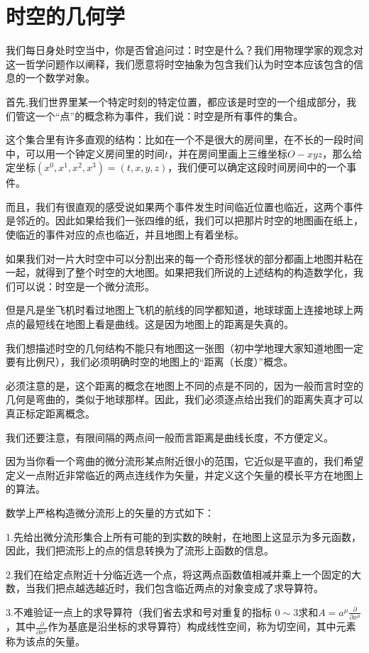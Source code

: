 \documentclass{article}
\begin{document}
\section{时空的几何学}
我们每日身处时空当中，你是否曾追问过：时空是什么？我们用物理学家的观念对这一哲学问题作以阐释，我们愿意将时空抽象为包含我们认为时空本应该包含的信息的一个数学对象。

首先,我们世界里某一个特定时刻的特定位置，都应该是时空的一个组成部分，我们管这一个“点”的概念称为事件，我们说：时空是所有事件的集合。

这个集合里有许多直观的结构：比如在一个不是很大的房间里，在不长的一段时间中，可以用一个钟定义房间里的时间$t$，并在房间里画上三维坐标$O-xyz$，那么给定坐标$(x^0,x^1,x^2,x^3)=(t,x,y,z)$，我们便可以确定这段时间房间中的一个事件。

而且，我们有很直观的感受说如果两个事件发生时间临近位置也临近，这两个事件是邻近的。因此如果给我们一张四维的纸，我们可以把那片时空的地图画在纸上，使临近的事件对应的点也临近，并且地图上有着坐标。

如果我们对一片大时空中可以分割出来的每一个奇形怪状的部分都画上地图并粘在一起，就得到了整个时空的大地图。如果把我们所说的上述结构的构造数学化，我们可以说：时空是一个微分流形。

但是凡是坐飞机时看过地图上飞机的航线的同学都知道，地球球面上连接地球上两点的最短线在地图上看是曲线。这是因为地图上的距离是失真的。

我们想描述时空的几何结构不能只有地图这一张图（初中学地理大家知道地图一定要有比例尺），我们必须明确时空的地图上的“距离（长度）”概念。

必须注意的是，这个距离的概念在地图上不同的点是不同的，因为一般而言时空的几何是弯曲的，类似于地球那样。因此，我们必须逐点给出我们的距离失真才可以真正标定距离概念。

我们还要注意，有限间隔的两点间一般而言距离是曲线长度，不方便定义。

因为当你看一个弯曲的微分流形某点附近很小的范围，它近似是平直的，我们希望定义一点附近非常临近的两点连线作为矢量，并定义这个矢量的模长平方在地图上的算法。

数学上严格构造微分流形上的矢量的方式如下：

1.先给出微分流形集合上所有可能的到实数的映射，在地图上这显示为多元函数，因此，我们把流形上的点的信息转换为了流形上函数的信息。

2.我们在给定点附近十分临近选一个点，将这两点函数值相减并乘上一个固定的大数，当我们把点越选越近时，我们包含临近两点的对象变成了求导算符。

3.不难验证一点上的求导算符（我们省去求和号对重复的指标 $ 0 \sim 3 $求和$A=a^\mu \frac{\partial}{\partial x^\mu }$，其中$\frac{\partial}{\partial x^\mu }$作为基底是沿坐标的求导算符）构成线性空间，称为切空间，其中元素称为该点的矢量。
\end{document}
